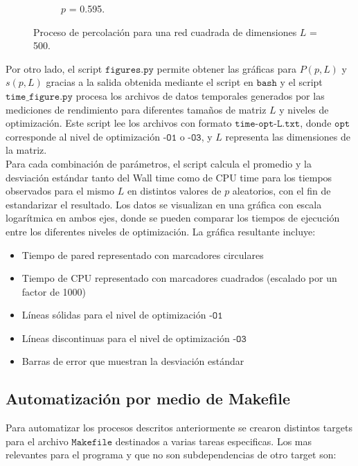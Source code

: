 \documentclass[12pt,a4paper]{article}
\begin{document}
\begin{figure}[H]
\begin{subfigure}[h]{0.45\textwidth}
        \caption{$p$ = 0.595.}
        \label{fig:3b}
    \end{subfigure}
    \caption{Proceso de percolación para una red cuadrada de dimensiones $L$ = 500.}
    \label{fig:3}
\end{figure}


Por otro lado, el script $\texttt{figures.py}$ permite obtener las gráficas para $P(p,L)$ y $s(p,L)$ gracias a la salida obtenida mediante el script en $\texttt{bash}$ y el script $\texttt{time\_figure.py}$ procesa los archivos de datos temporales generados por las mediciones de rendimiento para diferentes tamaños de matriz $L$ y niveles de optimización. Este script lee los archivos con formato $\texttt{time-opt-L.txt}$, donde $\texttt{opt}$ corresponde al nivel de optimización $\texttt{-O1}$ o $\texttt{-O3}$, y $L$ representa las dimensiones de la matriz.
\\

Para cada combinación de parámetros, el script calcula el promedio y la desviación estándar tanto del Wall time como de CPU time para los tiempos observados para el mismo $L$ en distintos valores de $p$ aleatorios, con el fin de estandarizar el resultado. Los datos se visualizan en una gráfica con escala logarítmica en ambos ejes, donde se pueden comparar los tiempos de ejecución entre los diferentes niveles de optimización. La gráfica resultante incluye:

\begin{itemize}
\item Tiempo de pared representado con marcadores circulares
\item Tiempo de CPU representado con marcadores cuadrados (escalado por un factor de 1000)
\item Líneas sólidas para el nivel de optimización $\texttt{-O1}$
\item Líneas discontinuas para el nivel de optimización $\texttt{-O3}$
\item Barras de error que muestran la desviación estándar
\end{itemize}

\subsection{Automatización por medio de Makefile}
Para automatizar los procesos descritos anteriormente se crearon distintos targets para el archivo $\texttt{Makefile}$ destinados a varias tareas especificas. Los mas relevantes para el programa y que no son subdependencias de otro target son:
\end{document}
